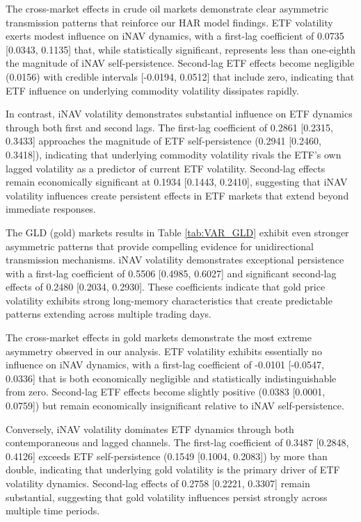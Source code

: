 The cross-market effects in crude oil markets demonstrate clear asymmetric transmission patterns that reinforce our HAR model findings. ETF volatility exerts modest influence on iNAV dynamics, with a first-lag coefficient of 0.0735 [0.0343, 0.1135] that, while statistically significant, represents less than one-eighth the magnitude of iNAV self-persistence. Second-lag ETF effects become negligible (0.0156) with credible intervals [-0.0194, 0.0512] that include zero, indicating that ETF influence on underlying commodity volatility dissipates rapidly.

In contrast, iNAV volatility demonstrates substantial influence on ETF dynamics through both first and second lags. The first-lag coefficient of 0.2861 [0.2315, 0.3433] approaches the magnitude of ETF self-persistence (0.2941 [0.2460, 0.3418]), indicating that underlying commodity volatility rivals the ETF's own lagged volatility as a predictor of current ETF volatility. Second-lag effects remain economically significant at 0.1934 [0.1443, 0.2410], suggesting that iNAV volatility influences create persistent effects in ETF markets that extend beyond immediate responses.

The GLD (gold) markets results in Table \ref{tab:VAR_GLD} exhibit even stronger asymmetric patterns that provide compelling evidence for unidirectional transmission mechanisms. iNAV volatility demonstrates exceptional persistence with a first-lag coefficient of 0.5506 [0.4985, 0.6027] and significant second-lag effects of 0.2480 [0.2034, 0.2930]. These coefficients indicate that gold price volatility exhibits strong long-memory characteristics that create predictable patterns extending across multiple trading days.

The cross-market effects in gold markets demonstrate the most extreme asymmetry observed in our analysis. ETF volatility exhibits essentially no influence on iNAV dynamics, with a first-lag coefficient of -0.0101 [-0.0547, 0.0336] that is both economically negligible and statistically indistinguishable from zero. Second-lag ETF effects become slightly positive (0.0383 [0.0001, 0.0759]) but remain economically insignificant relative to iNAV self-persistence.

Conversely, iNAV volatility dominates ETF dynamics through both contemporaneous and lagged channels. The first-lag coefficient of 0.3487 [0.2848, 0.4126] exceeds ETF self-persistence (0.1549 [0.1004, 0.2083]) by more than double, indicating that underlying gold volatility is the primary driver of ETF volatility dynamics. Second-lag effects of 0.2758 [0.2221, 0.3307] remain substantial, suggesting that gold volatility influences persist strongly across multiple time periods.

